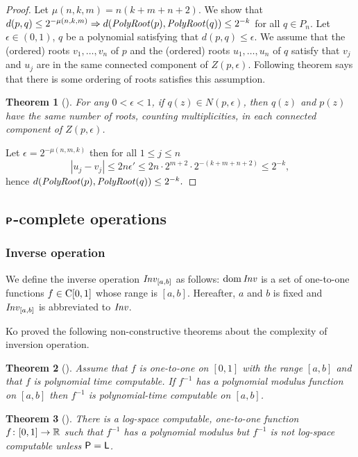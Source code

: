 \documentclass{article}
\newtheorem{theorem}{Theorem}[section]
\theoremstyle{definition}
\theoremstyle{remark}
\begin{document}
\begin{proof}
Let $\mu(n, k, m) = n(k+m+n+2)$.
We show that 
$
d(p, q) \le 2^{-\mu(n, k, m)} \Rightarrow d(\mathit{PolyRoot}(p), \mathit{PolyRoot}(q)) \le 2^{-k}
$
for all $q \in P_n$.
Let $\epsilon \in (0,1)$, $q$ be a polynomial satisfying that
 $d(p, q) \le \epsilon$.
We assume that the (ordered) roots $v_1, \dots, v_n$ of $p$
and the (ordered) roots $u_1, \dots, u_n$ of $q$ satisfy that
$v_j$ and $u_j$ are in the same connected component of $Z(p, \epsilon)$.
Following theorem says that there is some ordering of roots satisfies this assumption.
\begin{theorem}
[\cite{mosier1986root}]
\label{theorem: root neighborhoods 2}
 For any $0 < \epsilon < 1$, if $q(z) \in N(p, \epsilon)$,
 then $q(z)$ and $p(z)$ have the same number of roots,
 counting multiplicities, in each connected component of $Z(p, \epsilon)$.
\end{theorem}
Let $\epsilon = 2^{-\mu(n,m,k)}$ then for all $1 \le j \le n$
\begin{equation}
 |u_j - v_j| 
 \le
 2n\epsilon'
 \le
 2n \cdot 2^{m+2} \cdot 2^{-(k+m+n+2)} 
 \le
 2^{-k},
\end{equation}
hence
$
 d(\mathit{PolyRoot}(p), \mathit{PolyRoot}(q)) \le 2^{-k}.
$
\end{proof}

\subsection{\texorpdfstring{$\text{\bfseries \sffamily \upshape P}$}{P}-complete operations}
\label{section:P-complete}

\subsubsection{Inverse operation}

We define the inverse operation $\mathit{Inv}_{[a,b]}$ as follows:
$\mathop{\rm dom} \mathit{Inv}$ is a set of one-to-one functions $f \in \mathrm C[0,1]$
whose range is $[a,b]$.
Hereafter, $a$ and $b$ is fixed and $\mathit{Inv}_{[a,b]}$ is abbreviated to $\mathit{Inv}$.


Ko proved the following non-constructive theorems about the complexity of 
inversion operation.
\begin{theorem}
[{\cite[Corollary 4.7]{ko1991complexity}}]
\label{theorem:ko1991-4.7}
Assume that $f$ is one-to-one on $[0,1]$ with the range $[a, b]$ and that 
$f$ is polynomial time computable. 
If $f^{-1}$ has a polynomial modulus function on $[a,b]$ then
$f^{-1}$ is polynomial-time computable on $[a, b]$.
\end{theorem}
\begin{theorem}
[{\cite[Theorem 4.18]{ko1991complexity}}]
\label{theorem:ko1991-4.18}
There is a log-space computable, one-to-one function $f \colon [0, 1] \to \mathbb R$
such that $f^{-1}$ has a polynomial modulus 
but $f^{-1}$ is not log-space computable
unless $\mathsf{P} = \mathsf{L}$.
\end{theorem}
\end{document}
